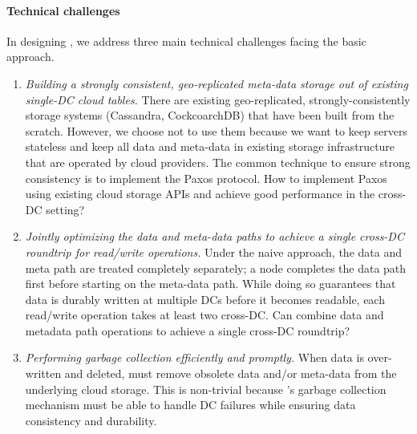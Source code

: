 \paragraph{Technical challenges}
In designing \name, we address three main technical challenges facing the basic approach.
\begin{enumerate}

\item {\it Building a strongly consistent, geo-replicated meta-data storage out of existing 
single-DC cloud tables.}  There are existing geo-replicated,
strongly-consistently storage systems (Cassandra, CockcoarchDB) that have been
built from the scratch.  However, we choose not to use them because we want to
keep \name servers stateless and keep all data and meta-data in existing
storage infrastructure that are operated by cloud providers. The common
technique to ensure strong consistency is to implement the Paxos protocol.  How
to implement Paxos using existing cloud storage APIs and achieve 
good performance in the cross-DC setting?

\item {\it Jointly optimizing the data and meta-data paths to achieve a single
cross-DC roundtrip for read/write operations.}  Under the naive approach, the
data and meta path are treated completely separately; a
\name node completes the data path first before starting on the meta-data path.
While doing so guarantees that data is durably written at multiple DCs before it becomes
readable, each read/write operation takes at least two cross-DC. Can \name 
combine data and metadata path operations to achieve a single cross-DC roundtrip?

\item {\it Performing garbage collection efficiently and promptly.}  When data is 
over-written and deleted, \name must remove obsolete data and/or meta-data from
the underlying cloud storage.  This is non-trivial because \name's garbage 
collection mechanism must be able to handle DC failures while ensuring data 
consistency and durability.

\end{enumerate}

%


